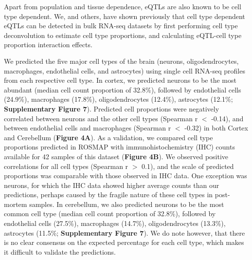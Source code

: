 Apart from population and tissue dependence, eQTLs are also known to be cell type dependent. We\cite{raulaguirregamboaDeconvolutionBulkBlood2020}, and others\cite{donovanCellularDeconvolutionGTEx2020,glastonburyCellTypeHeterogeneityAdipose2019}, have shown previously that cell type dependent eQTLs can be detected in bulk RNA-seq datasets by first performing cell type deconvolution to estimate cell type proportions, and calculating eQTL-cell type proportion interaction effects.  

We predicted the five major cell types of the brain (neurons, oligodendrocytes, macrophages, endothelial cells, and astrocytes) using single cell RNA-seq profiles from each respective cell type. In cortex, we predicted neurons to be the most abundant (median cell count proportion of 32.8\%), followed by endothelial cells (24.9\%), macrophages (17.8\%), oligodendrocytes (12.4\%), astrocytes (12.1\%; \textbf{Supplementary Figure 7}). Predicted cell proportions were negatively correlated between neurons and the other cell types (Spearman r $<$ -0.14), and between endothelial cells and macrophages (Spearman r $<$ -0.32) in both Cortex and Cerebellum (\textbf{Figure 4A}). As a validation, we compared cell type proportions predicted in ROSMAP with immunohistochemistry (IHC) counts available for 42 samples of this dataset\cite{patrickDeconvolvingContributionsCelltype2020} (\textbf{Figure 4B}). We observed positive correlations for all cell types (Spearman r $>$ 0.1), and the scale of predicted proportions was comparable with those observed in IHC data. One exception was neurons, for which the IHC data showed higher average counts than our predictions, perhaps caused by the fragile nature of these cell types in post-mortem samples. In cerebellum, we also predicted neurons to be the most common cell type (median cell count proportion of 32.8\%), followed by endothelial cells (27.5\%), macrophages (14.7\%), oligodendrocytes (13.3\%), astrocytes (11.5\%; \textbf{Supplementary Figure 7}). We do note however, that there is no clear consensus on the expected percentage for each cell type, which makes it difficult to validate the predictions\cite{herculano-houzelHumanBrainNumbers2009,vonbartheldSearchTrueNumbers2016}. 

